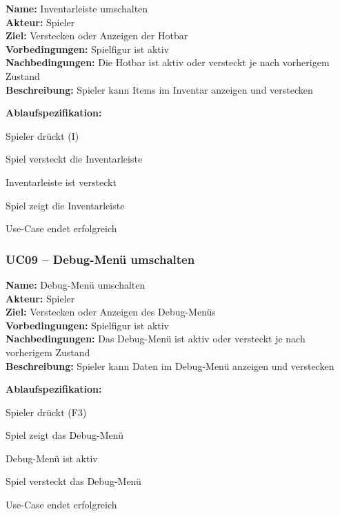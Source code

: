 \documentclass{article}
\begin{document}
\textbf{Name:} Inventarleiste umschalten \\
\textbf{Akteur:} Spieler \\
\textbf{Ziel:} Verstecken oder Anzeigen der Hotbar \\
\textbf{Vorbedingungen:} Spielfigur ist aktiv \\
\textbf{Nachbedingungen:} Die Hotbar ist aktiv oder versteckt je nach vorherigem Zustand \\
\textbf{Beschreibung:} Spieler kann Items im Inventar anzeigen und verstecken

\textbf{Ablaufspezifikation:}
\begin{description}[style=nextline,leftmargin=1.9cm,labelwidth=1.6cm]
  \item[1.] Spieler drückt (I)
  \item[2.] Spiel versteckt die Inventarleiste
  \item[2a.] Inventarleiste ist versteckt
  \item[2a.1.] Spiel zeigt die Inventarleiste
  \item[3.] Use-Case endet erfolgreich
\end{description}

\subsubsection*{UC09 – Debug-Menü umschalten}

\textbf{Name:} Debug-Menü umschalten \\
\textbf{Akteur:} Spieler \\
\textbf{Ziel:} Verstecken oder Anzeigen des Debug-Menüs \\
\textbf{Vorbedingungen:} Spielfigur ist aktiv \\
\textbf{Nachbedingungen:} Das Debug-Menü ist aktiv oder versteckt je nach vorherigem Zustand \\
\textbf{Beschreibung:} Spieler kann Daten im Debug-Menü anzeigen und verstecken

\textbf{Ablaufspezifikation:}
\begin{description}[style=nextline,leftmargin=1.9cm,labelwidth=1.6cm]
  \item[1.] Spieler drückt (F3)
  \item[2.] Spiel zeigt das Debug-Menü
  \item[2a.] Debug-Menü ist aktiv
  \item[2a.1.] Spiel versteckt das Debug-Menü
  \item[3.] Use-Case endet erfolgreich
\end{description}
\end{document}
